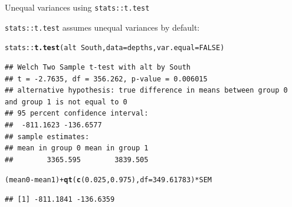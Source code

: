 \documentclass[10pt]{beamer}\usepackage[]{graphicx}\usepackage[]{color}
\makeatletter
\newcommand{\hlnum}[1]{\textcolor[rgb]{0.686,0.059,0.569}{#1}}%
\newcommand{\hlopt}[1]{\textcolor[rgb]{0,0,0}{#1}}%
\newcommand{\hlstd}[1]{\textcolor[rgb]{0.345,0.345,0.345}{#1}}%
\newcommand{\hlkwc}[1]{\textcolor[rgb]{0.333,0.667,0.333}{#1}}%
\newcommand{\hlkwd}[1]{\textcolor[rgb]{0.737,0.353,0.396}{\textbf{#1}}}%
\newenvironment{kframe}{%
 \def\at@end@of@kframe{}%
 \ifinner\ifhmode%
  \def\at@end@of@kframe{\end{minipage}}%
  \begin{minipage}{\columnwidth}%
 \fi\fi%
 \def\FrameCommand##1{\hskip\@totalleftmargin \hskip-\fboxsep
 \colorbox{shadecolor}{##1}\hskip-\fboxsep
     \hskip-\linewidth \hskip-\@totalleftmargin \hskip\columnwidth}%
 \MakeFramed {\advance\hsize-\width
   \@totalleftmargin\z@ \linewidth\hsize
   \@setminipage}}%
 {\par\unskip\endMakeFramed%
 \at@end@of@kframe}
\newenvironment{knitrout}{}{} %
\makeatother
\begin{document}
\begin{frame}[fragile]{Unequal variances using \texttt{stats::t.test}}
	
	\texttt{stats::t.test} assumes unequal variances by default:
	
	
\begin{knitrout}\scriptsize
{}\color{fgcolor}\begin{kframe}
\begin{alltt}
\hlstd{stats}\hlopt{::}\hlkwd{t.test}\hlstd{(alt} \hlopt{~} \hlstd{South,} \hlkwc{data} \hlstd{= depths,} \hlkwc{var.equal} \hlstd{=} \hlnum{FALSE}\hlstd{)}
\end{alltt}
\begin{verbatim}
## Welch Two Sample t-test with alt by South 
## t = -2.7635, df = 356.262, p-value = 0.006015
## alternative hypothesis: true difference in means between group 0 and group 1 is not equal to 0 
## 95 percent confidence interval:
##  -811.1623 -136.6577 
## sample estimates:
## mean in group 0 mean in group 1 
##        3365.595        3839.505
\end{verbatim}
\begin{alltt}
\hlstd{(mean0} \hlopt{-} \hlstd{mean1)} \hlopt{+} \hlkwd{qt}\hlstd{(}\hlkwd{c}\hlstd{(}\hlnum{0.025}\hlstd{,} \hlnum{0.975}\hlstd{),} \hlkwc{df} \hlstd{=} \hlnum{349.61783}\hlstd{)} \hlopt{*} \hlstd{SEM}
\end{alltt}
\begin{verbatim}
## [1] -811.1841 -136.6359
\end{verbatim}
\end{kframe}
\end{knitrout}
	
	
\end{frame}
\end{document}

